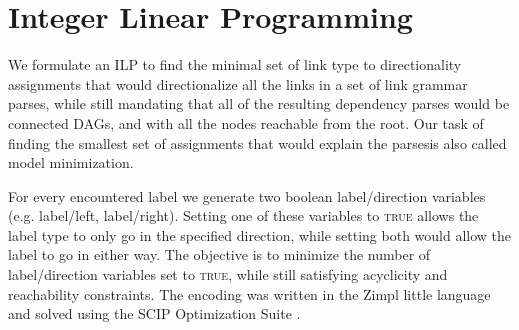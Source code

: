 \documentclass[11pt]{article}
\newcommand{\Note}[4][]{\todo[author=#2,color=#3,fancyline,#1]{#4}}
\newcommand{\noteJE}[2][]{\Note[#1]{JE}{green!40}{#2}}
\newcommand{\NoteJE}[2][]{\noteJE[inline,#1]{#2}}
\begin{document}




\section{Integer Linear Programming}
We formulate an ILP to find the minimal set of link type to directionality assignments that would directionalize all the links in a set of link grammar parses, while still mandating that all of the resulting dependency parses would be connected DAGs, and with all the nodes reachable from the root. Our task of finding the smallest set of assignments that would explain the parsesis also called model minimization\cite{ravi2009}.

For every encountered label we generate two boolean label/direction variables (e.g. label/left, label/right). Setting one of these variables to \textsc{true} allows the label type to only go in the specified direction, while setting both would allow the label to go in either way.
The objective is to minimize the number of label/direction variables set to \textsc{true}, while still satisfying acyclicity and reachability constraints. The encoding was written in the Zimpl little language \cite{Koch2004} and solved using the SCIP Optimization Suite \cite{achterberg2009scip}.
\end{document}
